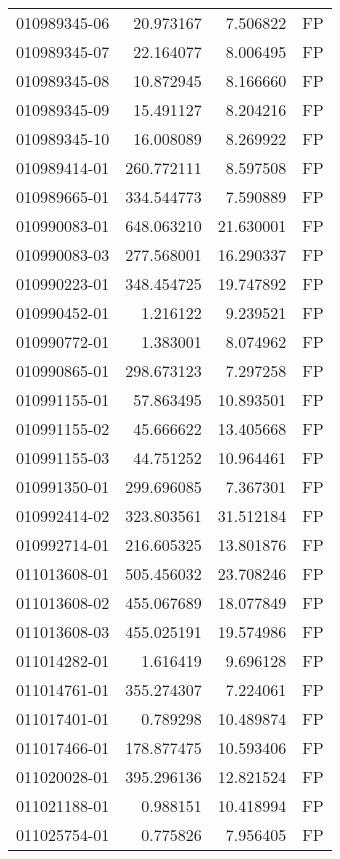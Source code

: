 \begin{tabular}{lrrl}
010989345-06 &   20.973167 &     7.506822 &   FP \\
010989345-07 &   22.164077 &     8.006495 &   FP \\
010989345-08 &   10.872945 &     8.166660 &   FP \\
010989345-09 &   15.491127 &     8.204216 &   FP \\
010989345-10 &   16.008089 &     8.269922 &   FP \\
010989414-01 &  260.772111 &     8.597508 &   FP \\
010989665-01 &  334.544773 &     7.590889 &   FP \\
010990083-01 &  648.063210 &    21.630001 &   FP \\
010990083-03 &  277.568001 &    16.290337 &   FP \\
010990223-01 &  348.454725 &    19.747892 &   FP \\
010990452-01 &    1.216122 &     9.239521 &   FP \\
010990772-01 &    1.383001 &     8.074962 &   FP \\
010990865-01 &  298.673123 &     7.297258 &   FP \\
010991155-01 &   57.863495 &    10.893501 &   FP \\
010991155-02 &   45.666622 &    13.405668 &   FP \\
010991155-03 &   44.751252 &    10.964461 &   FP \\
010991350-01 &  299.696085 &     7.367301 &   FP \\
010992414-02 &  323.803561 &    31.512184 &   FP \\
010992714-01 &  216.605325 &    13.801876 &   FP \\
011013608-01 &  505.456032 &    23.708246 &   FP \\
011013608-02 &  455.067689 &    18.077849 &   FP \\
011013608-03 &  455.025191 &    19.574986 &   FP \\
011014282-01 &    1.616419 &     9.696128 &   FP \\
011014761-01 &  355.274307 &     7.224061 &   FP \\
011017401-01 &    0.789298 &    10.489874 &   FP \\
011017466-01 &  178.877475 &    10.593406 &   FP \\
011020028-01 &  395.296136 &    12.821524 &   FP \\
011021188-01 &    0.988151 &    10.418994 &   FP \\
011025754-01 &    0.775826 &     7.956405 &   FP \\

\end{tabular}
